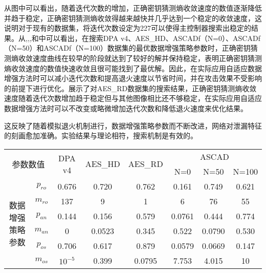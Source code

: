 {	从图中可以看出，随着迭代次数的增加，正确密钥猜测熵收敛速度的数值逐渐降低并趋于稳定，正确密钥猜测熵收敛得越来越快并几乎达到一个稳定的收敛速度，这说明对于现有的数据集，将迭代次数设定为227可以使得主控制器搜索出稳定的结果。从,,,和中可以看出，在搜索DPA v4、AES\_HD、ASCADf（N=0）、ASCADf（N=50）和ASCADf（N=100）数据集的最优数据增强策略参数时，正确密钥猜测熵收敛速度曲线在较早的阶段就达到了较好的解并保持稳定，表明正确密钥猜测熵收敛速度的数值快速收敛且很可能找到了最优解。因此，在实际应用自适应数据增强方法时可以减小迭代次数和提高退火速度以节省时间，并在攻击效果不受影响的前提下进行优化。展示了对AES\_RD数据集的搜索结果，正确密钥猜测熵收敛速度随着迭代次数增加趋于稳定但与其他图像相比还不够稳定，在实际应用自适应数据增强方法时可以不改变或略微增加迭代次数和降低退火速度来优化结果。
	
	这反映了随着模拟退火机制进行，数据增强策略参数而不断改进，网络对泄漏特征的刻画愈加准确。实验结果与理论相符，搜索机制是有效的。
	
	\begin{table}[!h]
		\label{tab:paras}
		\centering
		\small 
		\begin{tabular}{cc|cccccc}
			\hline
			\multicolumn{2}{c|}{\multirow{2}{*}{参数数值}} &\multirow{2}{*}{DPA v4}&\multirow{2}{*}{AES\_HD}&\multirow{2}{*}{AES\_RD}& \multicolumn{3}{c}{ASCAD} \\
			\multicolumn{2}{c|}{}&&&&N=0 & N=50 & N=100 \\
			\hline
			\multirow{6}{*}{数据增强策略参数}
			&$p_{ro}$&0.676&0.720&0.762&0.161&0.749&0.621\\
			&$m_{ro}$&137&9&1&6&76&55\\
			&$p_{an}$&0.144&0.156&0.579&0.0761&0.444&0.774\\
			&$m_{an}$&   0&0.0523&0.345&0.522&0.0790&0.530\\
			&$p_{os}$&0.706&0.617&0.879&0.0579&0.0669&0.147\\
			&$m_{os}$&$10^{-5}$&0.399&0.0795&7.753&4.015&10\\
			\hline
			
		\end{tabular}   
	\end{table}

}
